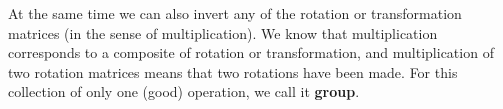 At the same time we can also invert any of the rotation or transformation matrices (in the sense of multiplication).
We know that multiplication corresponds to a composite of rotation or transformation, and multiplication of two rotation matrices means that two rotations have been made.
For this collection of only one (good) operation, we call it \textbf {group}.









%

